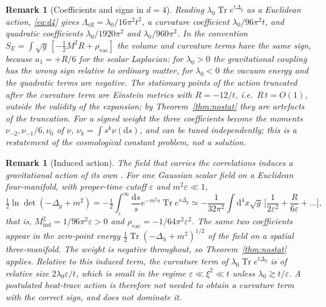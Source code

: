 \documentclass[11pt,a4paper]{article}
\theoremstyle{stmt}
\theoremstyle{defn}
\theoremstyle{rmk}
\newtheorem{remark}[theorem]{Remark}
\numberwithin{equation}{section}
\DeclareMathOperator{\Tr}{Tr}
\newcommand{\dd}{\mathrm{d}}
\begin{document}
\begin{remark}[Coefficients and signs in $d=4$]\label{rem:coeff}
Reading $\lambda_0\Tr e^{t\Delta_g}$ as a Euclidean action, \eqref{eq:d4} gives $\Lambda_{\mathrm{eff}}=\lambda_0/16\pi^2t^2$, a curvature coefficient $\lambda_0/96\pi^2t$, and quadratic coefficients $\lambda_0/1920\pi^2$ and $\lambda_0/960\pi^2$. In the convention $S_E=\int\sqrt g\,[-\tfrac12M^2R+\rho_{\mathrm{vac}}]$ the volume and curvature terms have the same sign, because $a_1=+R/6$ for the scalar Laplacian: for $\lambda_0>0$ the gravitational coupling has the wrong sign relative to ordinary matter, for $\lambda_0<0$ the vacuum energy and the quadratic terms are negative. The stationary points of the action truncated after the curvature term are Einstein metrics with $R=-12/t$, i.e.\ $R\,t=O(1)$, outside the validity of the expansion; by Theorem~\ref{thm:nostat} they are artefacts of the truncation. For a signed weight the three coefficients become the moments $\nu_{-2},\nu_{-1}/6,\nu_0$ of $\nu$, $\nu_k=\int s^k\nu(\dd s)$, and can be tuned independently; this is a restatement of the cosmological constant problem, not a solution.
\end{remark}

\begin{remark}[Induced action]\label{rem:induced}
The field that carries the correlations induces a gravitational action of its own \cite{Sakharov,Visser}. For one Gaussian scalar field on a Euclidean four-manifold, with proper-time cutoff $\varepsilon$ and $m^2\varepsilon\ll1$,
\begin{equation}
\tfrac12\ln\det(-\Delta_g+m^2)=-\tfrac12\int_\varepsilon^\infty\frac{\dd s}{s}e^{-m^2s}\Tr e^{s\Delta_g}\simeq-\frac{1}{32\pi^2}\int\!\dd^4x\sqrt g\,\Big[\frac{1}{2\varepsilon^2}+\frac{R}{6\varepsilon}+\dots\Big],
\end{equation}
that is, $M^2_{\mathrm{ind}}=1/96\pi^2\varepsilon>0$ and $\rho_{\mathrm{vac}}=-1/64\pi^2\varepsilon^2$. The same two coefficients appear in the zero-point energy $\tfrac12\Tr(-\Delta_h+m^2)^{1/2}$ of the field on a spatial three-manifold. The weight is negative throughout, so Theorem~\ref{thm:nostat} applies. Relative to this induced term, the curvature term of $\lambda_0\Tr e^{t\Delta_g}$ is of relative size $2\lambda_0\varepsilon/t$, which is small in the regime $\varepsilon\ll\xi^2\ll t$ unless $\lambda_0\gtrsim t/\varepsilon$. A postulated heat-trace action is therefore not needed to obtain a curvature term with the correct sign, and does not dominate it.
\end{remark}
\end{document}
